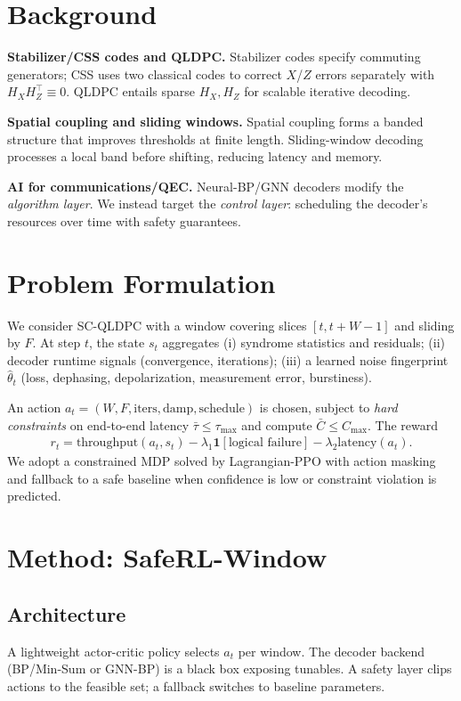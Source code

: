 \documentclass[conference]{IEEEtran}
\begin{document}
\section{Background}
\textbf{Stabilizer/CSS codes and QLDPC.} Stabilizer codes specify commuting generators; CSS uses two classical codes to correct $X$/$Z$ errors separately with $H_X H_Z^\top \equiv 0$. QLDPC entails sparse $H_X,H_Z$ for scalable iterative decoding.

\textbf{Spatial coupling and sliding windows.} Spatial coupling forms a banded structure that improves thresholds at finite length. Sliding-window decoding processes a local band before shifting, reducing latency and memory.

\textbf{AI for communications/QEC.} Neural-BP/GNN decoders modify the \emph{algorithm layer}. We instead target the \emph{control layer}: scheduling the decoder's resources over time with safety guarantees.

\section{Problem Formulation}
We consider SC-QLDPC with a window covering slices $[t, t{+}W{-}1]$ and sliding by $F$. At step $t$, the state $s_t$ aggregates (i) syndrome statistics and residuals; (ii) decoder runtime signals (convergence, iterations); (iii) a learned noise fingerprint $\hat{\theta}_t$ (loss, dephasing, depolarization, measurement error, burstiness).

An action $a_t=(W,F,\text{iters},\text{damp},\text{schedule})$ is chosen, subject to \emph{hard constraints} on end-to-end latency $\bar{\tau}\le\tau_{\max}$ and compute $\bar{C}\le C_{\max}$. The reward
\begin{align}
r_t = \text{throughput}(a_t,s_t) - \lambda_1 \mathbf{1}[\text{logical failure}] - \lambda_2 \text{latency}(a_t).
\end{align}
We adopt a constrained MDP solved by Lagrangian-PPO with action masking and fallback to a safe baseline when confidence is low or constraint violation is predicted.

\section{Method: SafeRL-Window}
\subsection{Architecture}
A lightweight actor-critic policy selects $a_t$ per window. The decoder backend (BP/Min-Sum or GNN-BP) is a black box exposing tunables. A safety layer clips actions to the feasible set; a fallback switches to baseline parameters.
\end{document}
